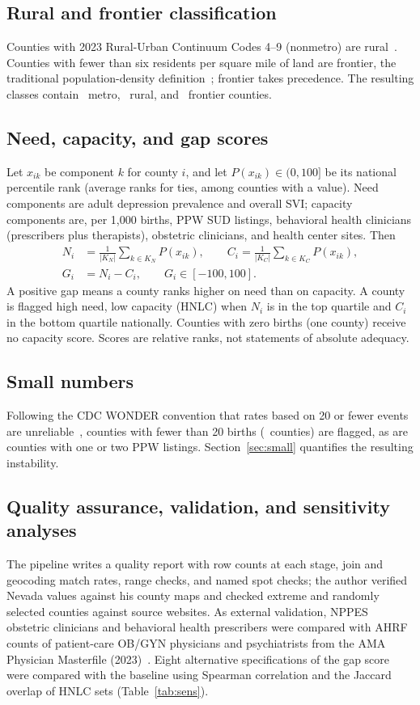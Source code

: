 \documentclass[10pt,twocolumn,letterpaper]{article}
\begin{document}
\subsection{Rural and frontier classification}
Counties with 2023 Rural-Urban Continuum Codes 4--9 (nonmetro) are rural~\cite{rucc}. Counties with fewer than six residents per square mile of land are frontier, the traditional population-density definition~\cite{ncfc}; frontier takes precedence. The resulting classes contain \NMetro\ metro, \NRural\ rural, and \NFrontier\ frontier counties.

\subsection{Need, capacity, and gap scores}
Let $x_{ik}$ be component $k$ for county $i$, and let $P(x_{ik})\in(0,100]$ be its national percentile rank (average ranks for ties, among counties with a value). Need components are adult depression prevalence and overall SVI; capacity components are, per 1,000 births, PPW SUD listings, behavioral health clinicians (prescribers plus therapists), obstetric clinicians, and health center sites. Then
\begin{align}
N_i &= \frac{1}{|K_N|}\sum_{k\in K_N} P(x_{ik}), \qquad C_i = \frac{1}{|K_C|}\sum_{k\in K_C} P(x_{ik}),\\
G_i &= N_i - C_i,\qquad G_i\in[-100,100].
\end{align}
A positive gap means a county ranks higher on need than on capacity. A county is flagged high need, low capacity (HNLC) when $N_i$ is in the top quartile and $C_i$ in the bottom quartile nationally. Counties with zero births (one county) receive no capacity score. Scores are relative ranks, not statements of absolute adequacy.

\subsection{Small numbers}
Following the CDC WONDER convention that rates based on 20 or fewer events are unreliable~\cite{wonder}, counties with fewer than 20 births (\NSmallBirths\ counties) are flagged, as are counties with one or two PPW listings. Section~\ref{sec:small} quantifies the resulting instability.

\subsection{Quality assurance, validation, and sensitivity analyses}
The pipeline writes a quality report with row counts at each stage, join and geocoding match rates, range checks, and named spot checks; the author verified Nevada values against his county maps and checked extreme and randomly selected counties against source websites. As external validation, NPPES obstetric clinicians and behavioral health prescribers were compared with AHRF counts of patient-care OB/GYN physicians and psychiatrists from the AMA Physician Masterfile (2023)~\cite{ahrf}. Eight alternative specifications of the gap score were compared with the baseline using Spearman correlation and the Jaccard overlap of HNLC sets (Table~\ref{tab:sens}).
\end{document}
